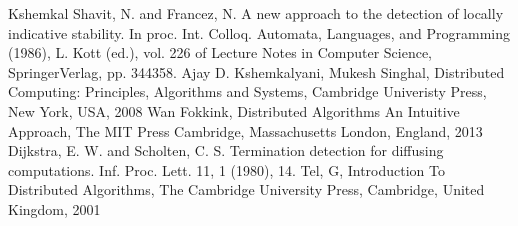 \documentclass[letterpaper,10pt,english]{sphinxmanual}
\begin{document}
\begin{sphinxthebibliography}{Kshemkal}
\sphinxAtStartPar
Shavit, N. and Francez, N. A new approach to the detection of locally indicative stability. In proc. Int. Colloq. Automata, Languages, and Programming (1986), L. Kott (ed.), vol. 226 of Lecture Notes in Computer Science, Springer\sphinxhyphen{}Verlag, pp. 344\sphinxhyphen{}358.
\sphinxAtStartPar
Ajay D. Kshemkalyani, Mukesh Singhal, Distributed Computing: Principles, Algorithms and Systems, Cambridge Univeristy Press, New York, USA, 2008
\sphinxAtStartPar
Wan Fokkink, Distributed Algorithms An Intuitive Approach, The MIT Press Cambridge, Massachusetts London, England, 2013
\sphinxAtStartPar
Dijkstra, E. W. and Scholten, C. S. Termination detection for diffusing computations. Inf. Proc. Lett. 11, 1 (1980), 1\sphinxhyphen{}4.
\sphinxAtStartPar
Tel, G, Introduction To Distributed Algorithms, The Cambridge University Press, Cambridge, United Kingdom, 2001
\end{sphinxthebibliography}



\renewcommand{\indexname}{Index}
\printindex
\end{document}
